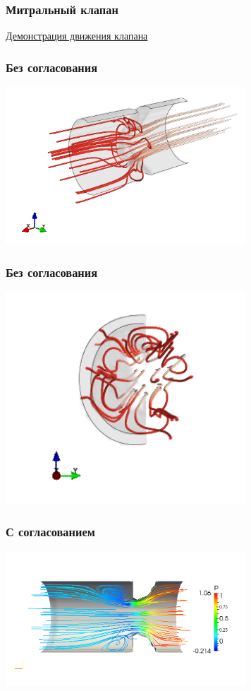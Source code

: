 \documentclass[14pt]{beamer}
\begin{document}
\begin{frame}
\frametitle{Митральный клапан}
    \begin{center}
        \href{run:video/MV\_side.mov}{Демонстрация движения клапана}
    \end{center}
\end{frame}

\begin{frame}
\frametitle{Без согласования}
    \begin{center}
    \includegraphics[width=9cm]{images/valves_resized_with_bound.png}
    \end{center}
\end{frame}

\begin{frame}
\frametitle{Без согласования}
    \begin{center}
    \includegraphics[width=9cm]{images/valves_resized_with_bound_front.png}
    \end{center}
\end{frame}

\begin{frame}
\frametitle{С согласованием}
    \begin{center}
    \includegraphics[width=9cm]{images/valves_simple.png}
    \end{center}
\end{frame}
\end{document}

